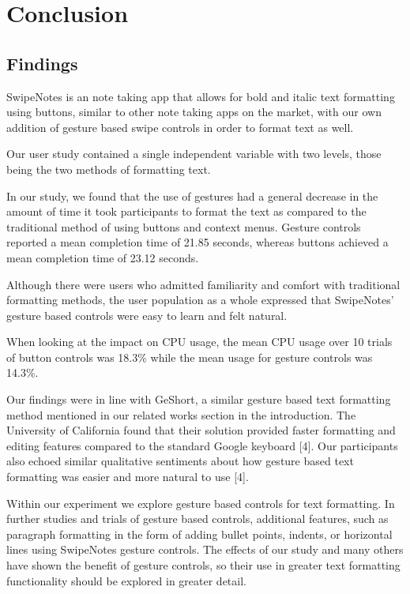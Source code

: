 \documentclass[conference]{IEEEtran}
\begin{document}
\section{Conclusion}
\subsection{Findings}
SwipeNotes is an note taking app that allows for bold and italic text formatting using buttons, similar to other note taking apps on the market, with our own addition of gesture based swipe controls in order to format text as well.

Our user study contained a single independent variable with two levels, those being the two methods of formatting text.

In our study, we found that the use of gestures had a general decrease in the amount of time it took participants to format the text as compared to the traditional method of using buttons and context menus. Gesture controls reported a mean completion time of 21.85 seconds, whereas buttons achieved a mean completion time of 23.12 seconds.

Although there were users who admitted familiarity and comfort with traditional formatting methods, the user population as a whole expressed that SwipeNotes' gesture based controls were easy to learn and felt natural.

When looking at the impact on CPU usage, the mean CPU usage over 10 trials of button controls was 18.3\% while the mean usage for gesture controls was 14.3\%.

Our findings were in line with GeShort, a similar gesture based text formatting method mentioned in our related works section in the introduction. The University of California found that their solution provided faster formatting and editing features compared to the standard Google keyboard [4]. Our participants also echoed similar qualitative sentiments about how gesture based text formatting was easier and more natural to use [4].

Within our experiment we explore gesture based controls for text formatting. In further studies and trials of gesture based controls, additional features, such as paragraph formatting in the form of adding bullet points, indents, or horizontal lines using SwipeNotes gesture controls. The effects of our study and many others have shown the benefit of gesture controls, so their use in greater text formatting functionality should be explored in greater detail.
\end{document}
